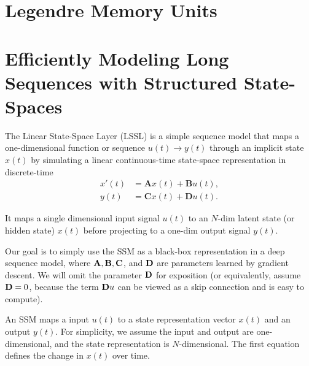 

\section{Legendre Memory Units}
\label{sec:nlp_lmu}


\section{Efficiently Modeling Long Sequences with Structured State-Spaces}
\label{sec:nlp_ssm}
The Linear State-Space Layer (LSSL) is a simple sequence model that maps a one-dimensional function  or sequence $u(t)\to y(t)$ through an implicit state $x(t)$ by simulating a linear continuous-time state-space representation in discrete-time
\begin{align*}
	x'(t) &= \mathbf{A}x(t)+\mathbf{B}u(t),\\
	y(t) &= \mathbf{C}x(t)+\mathbf{D}u(t).
\end{align*}

It maps a single dimensional input signal $u(t)$ to an $N$-dim latent state (or hidden state) $x(t)$ before projecting to a one-dim output signal $y(t)$.  

Our goal is to simply use the SSM as a black-box representation in a deep sequence model, where ${\mathbf{A}}, {\mathbf{B}}, {\mathbf{C}}$, and ${\mathbf{D}}$ are parameters learned by gradient descent. We will omit the parameter ${\mathbf{D}}$ for exposition (or equivalently, assume ${\mathbf{D}}=0$, because the term ${\mathbf{D}} u$ can be viewed as a skip connection and is easy to compute).

An SSM maps a input $u(t)$ to a state representation vector $x(t)$ and an output $y(t)$. For simplicity, we assume the input and output are one-dimensional, and the state representation is $N$-dimensional. The first equation defines the change in $x(t)$ over time.

